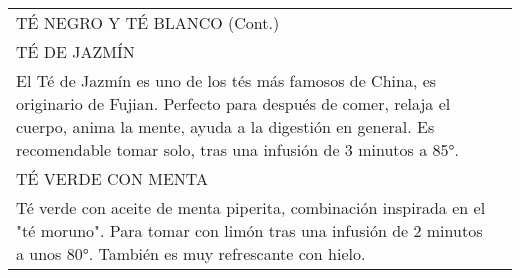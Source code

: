\documentclass[12pt a5paper]{article}
\makeatletter
\newcommand*\ColText[1]{\textcolor{Goldenrod3}{#1}}
\newenvironment{Group}[1]
{\noindent\begin{tabular*}{\textwidth}{@{}p{1\linewidth}@{\extracolsep{\fill}}r@{}}
{\fontsize{24}{29}\selectfont\ColText{#1}}
              \\[0.8em]}
              {
\end{tabular*}}
\newcommand*\Entry[1]{%
    \sffamily#1}
\newcommand*\Expl[1]{%
    \hspace*{1em}\footnotesize #1}
\makeatother
\begin{document}
\begin{Group}{TÉ NEGRO Y TÉ BLANCO (Cont.)}
        \Entry{TÉ DE JAZMÍN} \\
        \Expl{El Té de Jazmín es uno de los tés más famosos de China, es originario de Fujian. Perfecto para después de comer, relaja el cuerpo, anima la mente, ayuda a la digestión en general. Es recomendable tomar solo, tras una infusión de 3 minutos a 85°.} \\
        \Entry{TÉ VERDE CON MENTA} \\
        \Expl{Té verde con aceite de menta piperita, combinación inspirada en el "té moruno". Para tomar con limón tras una infusión de 2 minutos a unos 80°. También es muy refrescante con hielo.} \\
    \end{Group}
\end{document}
